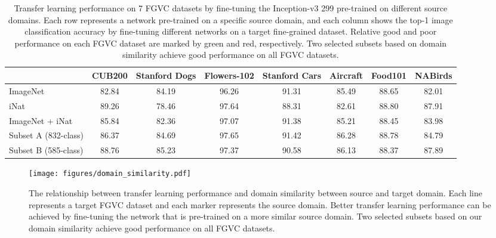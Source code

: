 \documentclass[10pt,twocolumn,letterpaper]{article}
\begin{document}
\begin{table*}[t]
\small
\begin{center}
\begin{tabular}{ l|c|c|c|c|c|c|c }
\hline
& CUB200 & Stanford Dogs & Flowers-102 & Stanford Cars & Aircraft & Food101 & NABirds \\ \hline
ImageNet & \cellcolor{red!25}82.84 & 84.19 & \cellcolor{red!25}96.26 & 91.31 & 85.49 & 88.65 & \cellcolor{red!25}82.01 \\
iNat & \cellcolor{green!25}89.26 & \cellcolor{red!25}78.46 & \cellcolor{green!25}97.64 & \cellcolor{red!25}88.31 & \cellcolor{red!25}82.61 & 88.80 & \cellcolor{green!25}87.91 \\
ImageNet + iNat & 85.84 & 82.36 & 97.07 & 91.38 & 85.21 & 88.45 & 83.98 \\
Subset A (832-class) & 86.37 & 84.69 & \cellcolor{green!25}97.65 & \cellcolor{green!25}91.42 & \cellcolor{green!25}86.28 & 88.78 & 84.79 \\
Subset B (585-class) & 88.76 & \cellcolor{green!25}85.23 & 97.37 & 90.58 & 86.13 & 88.37 & \cellcolor{green!25}87.89 \\ \hline
\end{tabular}
\end{center}
\caption{Transfer learning performance on 7 FGVC datasets by fine-tuning the Inception-v3 299 pre-trained on different source domains. Each row represents a network pre-trained on a specific source domain, and each column shows the top-1 image classification accuracy by fine-tuning different networks on a target fine-grained dataset. Relative good and poor performance on each FGVC dataset are marked by green and red, respectively. Two selected subsets based on domain similarity achieve good performance on all FGVC datasets.}
\label{tab:fgvc}
\end{table*}


\begin{figure}[t]
\centering
\texttt{[image: figures/domain\_similarity.pdf]}
\caption{The relationship between transfer learning performance and domain similarity between source and target domain. 
Each line represents a target FGVC dataset and each marker represents the source domain.
Better transfer learning performance can be achieved by fine-tuning the network that is pre-trained on a more similar source domain.
Two selected subsets based on our domain similarity achieve good performance on all FGVC datasets.}
\label{fig:domain-similarity}
\end{figure}
\end{document}
